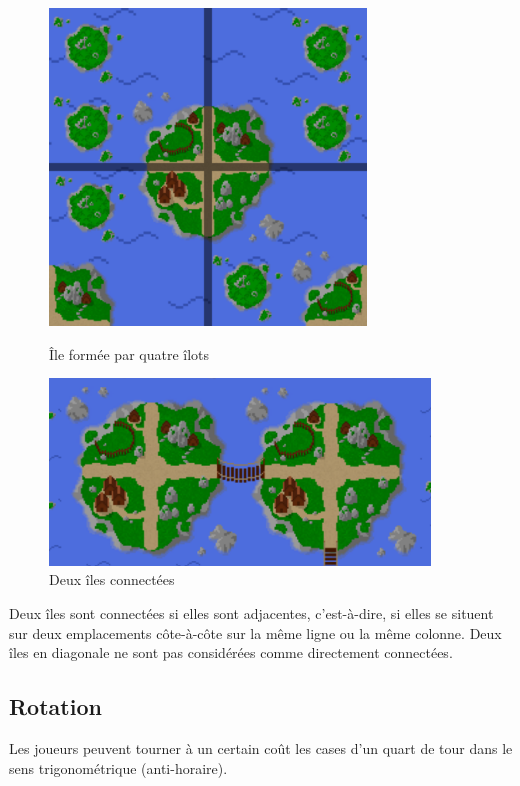 \begin{figure}[h]
    \centering
    \begin{minipage}{.35\textwidth}
        \centering
        \includegraphics[width=0.75\textwidth]{img/sprites/ile.png}
        \caption{Île formée par quatre îlots}
    \end{minipage}
    \begin{minipage}{.6\textwidth}
        \centering
        \includegraphics[width=0.9\textwidth]{img/pont.png}
        \caption{Deux îles connectées}
    \end{minipage}
\end{figure}

Deux îles sont connectées si elles sont adjacentes, c'est-à-dire, si elles
se situent sur deux emplacements côte-à-côte sur la même ligne ou la même
colonne.
Deux îles en diagonale ne sont pas considérées comme directement connectées.

\subsection{Rotation}\label{sec:rotation}
Les joueurs peuvent tourner à un certain coût les cases d'un quart de tour dans
le sens trigonométrique (anti-horaire).

